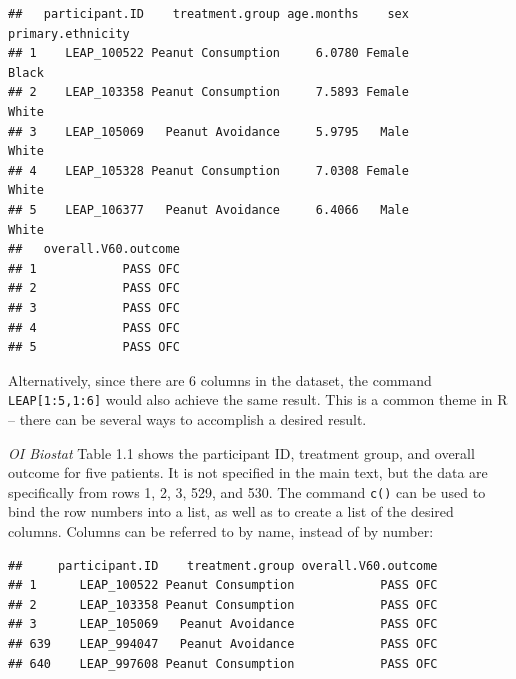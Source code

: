 \begin{knitrout}
\color{fgcolor}\begin{kframe}
\begin{alltt}
\hlstd{LEAP[}\hlopt{:}\hlstd{, ]}
\end{alltt}
\begin{verbatim}
##   participant.ID    treatment.group age.months    sex primary.ethnicity
## 1    LEAP_100522 Peanut Consumption     6.0780 Female             Black
## 2    LEAP_103358 Peanut Consumption     7.5893 Female             White
## 3    LEAP_105069   Peanut Avoidance     5.9795   Male             White
## 4    LEAP_105328 Peanut Consumption     7.0308 Female             White
## 5    LEAP_106377   Peanut Avoidance     6.4066   Male             White
##   overall.V60.outcome
## 1            PASS OFC
## 2            PASS OFC
## 3            PASS OFC
## 4            PASS OFC
## 5            PASS OFC
\end{verbatim}
\end{kframe}
\end{knitrout}

Alternatively, since there are 6 columns in the dataset, the command \texttt{LEAP[1:5,1:6]} would also achieve the same result. This is a common theme in \textsf{R} -- there can be several ways to accomplish a desired result. 

\textit{OI Biostat} Table 1.1 shows the participant ID, treatment group, and overall outcome for five patients. It is not specified in the main text, but the data are specifically from rows 1, 2, 3, 529, and 530. The command \texttt{c()} can be used to bind the row numbers into a list, as well as to create a list of the desired columns. Columns can be referred to by name, instead of by number:

\begin{knitrout}
\color{fgcolor}\begin{kframe}
\begin{alltt}
\hlstd{LEAP[}\hlstd{(}\hlstd{,} \hlstd{,} \hlstd{,} \hlstd{,} \hlstd{),}\hlstd{(}\hlstd{,} \hlstd{,}
                         \hlstd{)]}
\end{alltt}
\begin{verbatim}
##     participant.ID    treatment.group overall.V60.outcome
## 1      LEAP_100522 Peanut Consumption            PASS OFC
## 2      LEAP_103358 Peanut Consumption            PASS OFC
## 3      LEAP_105069   Peanut Avoidance            PASS OFC
## 639    LEAP_994047   Peanut Avoidance            PASS OFC
## 640    LEAP_997608 Peanut Consumption            PASS OFC
\end{verbatim}
\end{kframe}
\end{knitrout}

